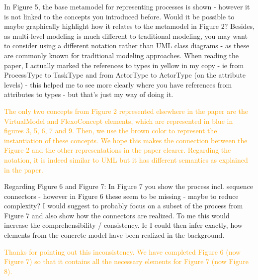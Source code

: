 \documentclass[10pt]{article}
\begin{document}
\begin{response}{In Figure 5, the base metamodel for representing processes is shown - however it is not linked to the concepts you introduced before. Would it be possible to maybe graphically highlight how it relates to the metamodel in Figure 2? Besides, as multi-level modeling is much different to traditional modeling, you may want to consider using a different notation rather than UML class diagrams - as these are commonly known for traditional modeling approaches. When reading the paper, I actually marked the references to types in yellow in my copy - ie from ProcessType to TaskType and from ActorType to ActorType (on the attribute levels) - this helped me to see more clearly where you have references from attributes to types - but that's just my way of doing it.}

\textcolor{orange}{The only two concepts from Figure 2 represented elsewhere in the paper are the \textsf{VirtualModel} and \textsf{FlexoConcept} elements, which are represented in blue in figures 3, 5, 6, 7 and 9. Then, we use the brown color to represent the instantiation of these concepts. We hope this makes the connection between the Figure 2 and the other representations in the paper clearer. Regarding the notation, it is indeed similar to UML but it has different semantics as explained in the paper.}



\end{response}

\begin{response}{Regarding Figure 6 and Figure 7: In Figure 7 you show the process incl. sequence connectors - however in Figure 6 these seem to be missing - maybe to reduce complexity? I would suggest to probably focus on a subset of the process from Figure 7 and also show how the connectors are realized. To me this would increase the comprehensibility / consistency. Ie I could then infer exactly, how elements from the concrete model have been realized in the background.}

\textcolor{orange}{Thanks for pointing out this inconsistency. We have completed Figure 6 (now Figure 7) so that it contains all the necessary elements for Figure 7 (now Figure 8).}


\end{response}
\end{document}
